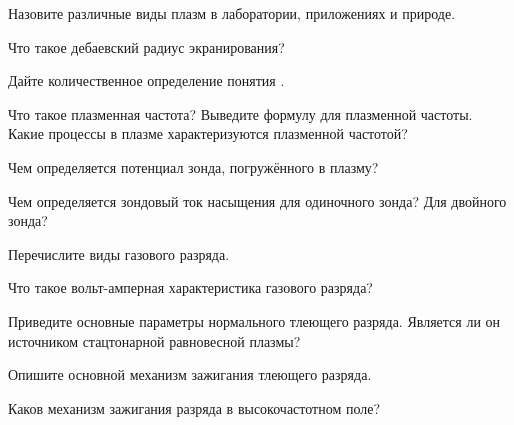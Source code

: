 


\begin{lab:questions}

\item Назовите различные виды плазм в лаборатории, приложениях и природе.

\item Что такое дебаевский радиус экранирования?

\item Дайте количественное определение понятия .

\item Что такое плазменная частота? Выведите формулу для плазменной частоты.
Какие процессы в плазме характеризуются плазменной частотой?

\item Чем определяется потенциал зонда, погружённого в плазму?

\item Чем определяется зондовый ток насыщения для одиночного зонда? Для двойного
зонда?

\item Перечислите виды газового разряда.

\item Что такое вольт-амперная характеристика газового разряда?

\item Приведите основные параметры нормального тлеющего разряда. Является ли он
источником стацтонарной равновесной плазмы?

\item Опишите основной механизм зажигания тлеющего разряда.

\item Каков механизм зажигания разряда в высокочастотном поле?

\end{lab:questions}


